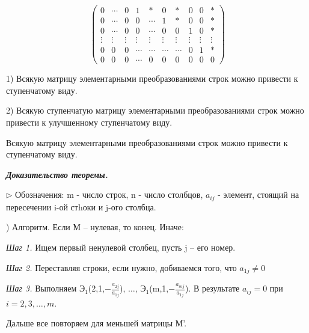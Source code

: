 \begin{equation*}
	\begin{pmatrix}
    	0 & \cdots & 0 & 1 & * & 0 & * & 0 & 0 & * \\
        0 & \cdots & 0 & 0 & \cdots & 1 & * & 0 & 0 & * \\
        0 & \cdots & 0 & 0 & \cdots & 0 & 0 & 1 & 0 & * \\
        \vdots & \vdots & \vdots& \vdots & \vdots & \vdots & \vdots & \vdots & \vdots& \vdots \\
        0 & 0 & 0 & \cdots & \cdots & \cdots & \cdots & 0 & 1 & *\\
        0 & 0 & 0 & \cdots & 0 & 0 & 0 & 0 & 0 & 0
	\end{pmatrix}
\end{equation*}

\begin{theorem}[]\label{theorem1}
	1) Всякую матрицу элементарными преобразованиями строк можно привести к ступенчатому виду.

2) Всякую ступенчатую матрицу элементарными преобразованиями строк можно привести к улучшенному ступенчатому виду.
\end{theorem}

\begin{corollary}
	Всякую матрицу элементарными преобразованиями строк можно привести к ступенчатому виду.
\end{corollary}

\begin{comment}
	Улучшенный ступенчатый вид матрицы определен однозначно.
\end{comment}

\textbf{\textit{Доказательство теоремы.}} 

$\rhd$ Обозначения: m - число строк, n - число столбцов, $a_{ij}$ - элемент, стоящий на пересечении i-ой стhоки и j-ого столбца.

) Алгоритм. Если М -- нулевая, то конец. Иначе:

\textit{Шаг 1.} Ищем первый ненулевой столбец, пусть j -- его номер.

\textit{Шаг 2.} Переставляя строки, если нужно, добиваемся того, что $a_{1j} \neq 0 $

\textit{Шаг 3.} Выполняем $Э_1$(2,1,$-\frac{a_{2j}}{a_{1j}}$), $\dots$, $Э_1$(m,1,$-\frac{a_{mj}}{a_{1j}}$). В результате $a_{ij} = 0$ при $i = 2,3, \dots, m$. 

Дальше все повторяем для меньшей матрицы М'.

